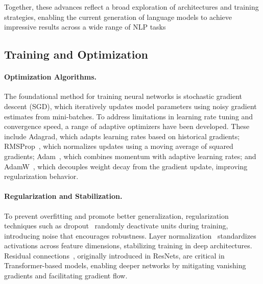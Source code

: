 Together, these advances reflect a broad exploration of architectures and training strategies, enabling the current generation of language models to achieve impressive results across a wide range of NLP tasks

\subsection{Training and Optimization}

\paragraph{Optimization Algorithms.} The foundational method for training neural networks is stochastic gradient descent (SGD)\citep{robbins1951stochastic}, which iteratively updates model parameters using noisy gradient estimates from mini-batches. To address limitations in learning rate tuning and convergence speed, a range of adaptive optimizers have been developed. These include Adagrad\citep{duchi2011adaptive}, which adapts learning rates based on historical gradients; RMSProp~\citep{tieleman2012lecture}, which normalizes updates using a moving average of squared gradients; Adam~\citep{kingma2015adam}, which combines momentum with adaptive learning rates; and AdamW~\citep{loshchilov2019decoupled}, which decouples weight decay from the gradient update, improving regularization behavior.

\paragraph{Regularization and Stabilization.} To prevent overfitting and promote better generalization, regularization techniques such as dropout~\citep{srivastava2014dropout} randomly deactivate units during training, introducing noise that encourages robustness. Layer normalization~\citep{ba2016layernorm} standardizes activations across feature dimensions, stabilizing training in deep architectures. Residual connections~\citep{he2016deep}, originally introduced in ResNets, are critical in Transformer-based models, enabling deeper networks by mitigating vanishing gradients and facilitating gradient flow.

